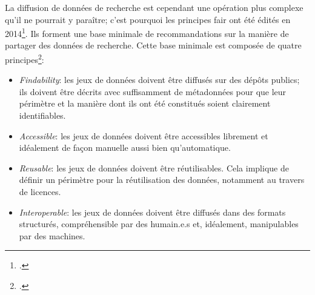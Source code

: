 La diffusion de données de recherche est cependant une opération plus complexe qu'il ne pourrait y paraître; c'est pourquoi les principes \gls{fair} ont été édités en 2014\footcite[p. 931]{boeckhout_fair_2018}. Ils forment une base minimale de recommandations sur la manière de partager des données de recherche. Cette base minimale est composée de quatre principes\footcite[p. 932-933]{boeckhout_fair_2018}: 

\begin{itemize}
	\item \textit{Findability}: les jeux de données doivent être diffusés sur des dépôts publics; ils doivent être décrits avec suffisamment de métadonnées pour que leur périmètre et la manière dont ils ont été constitués soient clairement identifiables.
	\item \textit{Accessible}: les jeux de données doivent être accessibles librement et idéalement de façon manuelle aussi bien qu'automatique.
	\item \textit{Reusable}: les jeux de données doivent être réutilisables. Cela implique de définir un périmètre pour la réutilisation des données, notamment au travers de licences.
	\item \textit{Interoperable}: les jeux de données doivent être diffusés dans des formats structurés, compréhensible par des humain.e.s et, idéalement, manipulables par des machines.
\end{itemize}

